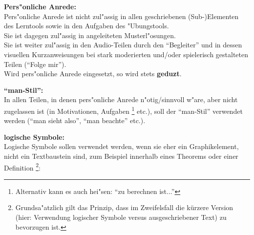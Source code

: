 \begin{list_sabina}
\item
\textbf{Pers"onliche Anrede:}\\
Pers"onliche Anrede ist nicht zul"assig in allen geschriebenen 
(Sub-)Elementen des Lerntools sowie in den Aufgaben des "Ubungstools.\\
Sie ist dagegen zul"assig in angeleiteten Musterl"osungen.\\
Sie ist weiter zul"assig in den Audio-Teilen durch den ``Begleiter'' 
und in dessen visuellen Kurzanweisungen bei stark moderierten 
und/oder spielerisch gestalteten Teilen (``Folge mir'').\\
Wird pers"onliche Anrede eingesetzt, so wird stets \textbf{geduzt}.

\item
\textbf{``man-Stil'':}\\
In allen Teilen, in denen pers"onliche Anrede n"otig/sinnvoll w"are, 
aber nicht zugelassen ist (in Motivationen, Aufgaben
\footnote{Alternativ kann es auch hei"sen: ``zu berechnen ist...''} etc.), soll der
``man-Stil'' verwendet werden (``man sieht also'', ``man beachte'' etc.).

\clearpage

\item
\textbf{logische Symbole:}\\
Logische Symbole sollen verwendet werden, wenn sie eher ein Graphikelement, 
nicht ein Textbaustein sind, zum Beispiel innerhalb eines Theorems oder
einer Definition
\footnote{Grundsa"atzlich gilt das Prinzip, dass im Zweifelsfall
die k\"urzere Version (hier: Verwendung logischer Symbole versus ausgeschriebener Text)
zu bevorzugen ist.}:\\

\begin{center}\label{logische_symbole_bsp}
\end{center}


\end{list_sabina}
